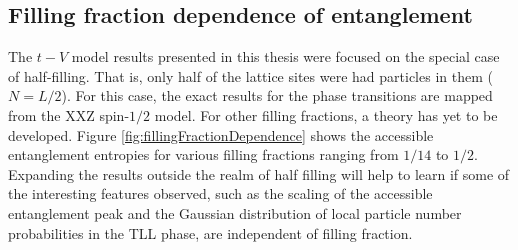 	
	\subsection{Filling fraction dependence of entanglement}
	
	The $t-V$ model results presented in this thesis were focused on the special case of half-filling. That is, only half of the lattice sites were had particles in them ($N = L/2$). For this case, the exact results for the phase transitions are mapped from the XXZ spin-$1/2$ model. For other filling fractions, a theory has yet to be developed. Figure \ref{fig:fillingFractionDependence} shows the accessible entanglement entropies for various filling fractions ranging from $1/14$ to $1/2$. Expanding the results outside the realm of half filling will help to learn if some of the interesting features observed, such as the scaling of the accessible entanglement peak and the Gaussian distribution of local particle number probabilities in the TLL phase, are independent of filling fraction. 
	
